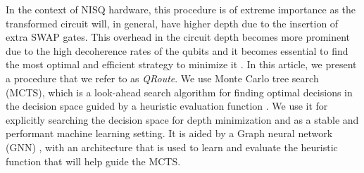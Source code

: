 In the context of NISQ hardware, this procedure is of extreme importance as the transformed circuit will, in general, have higher depth due to the insertion of extra SWAP gates. This overhead in the circuit depth becomes more prominent due to the high decoherence rates of the qubits and it becomes essential to find the most optimal and efficient strategy to minimize it \cite{qroute_tket, qroute_dqn1, qroute_dqn2}. In this article, we present a procedure that we refer to as \textit{QRoute}. We use Monte Carlo tree search (MCTS), which is a look-ahead search algorithm for finding optimal decisions in the decision space guided by a heuristic evaluation function \cite{mcts_bandit_1, mcts_bandit_2, mcts_uct}. We use it for explicitly searching the decision space for depth minimization and as a stable and performant machine learning setting. It is aided by a Graph neural network (GNN) \cite{nn_edge_conv}, with an architecture that is used to learn and evaluate the heuristic function that will help guide the MCTS.


